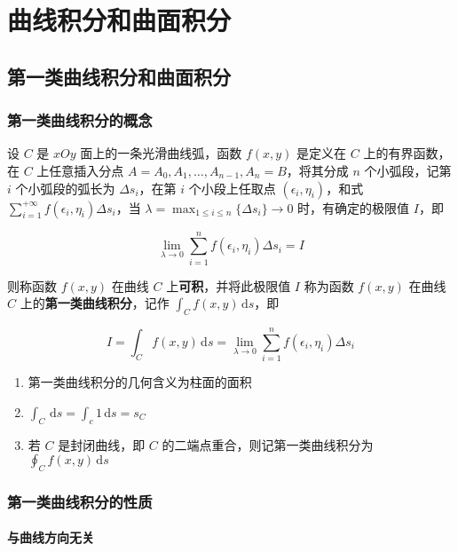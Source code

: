 \documentclass[lang = zh , final , oneside , openany , titlepage , zihao = -4 , linespread = 1.3 , baselineskip = false , cjk-font = windows , text-font = newtx , math-font = newtx , math-style = ISO , uppercase-greek = upright , integral-limits = false]{sjtureport}
\begin{document}
\chapter{曲线积分和曲面积分}

\section{第一类曲线积分和曲面积分}

\subsection{第一类曲线积分的概念}

\begin{definition}
    设 \(C\) 是 \(xOy\) 面上的一条光滑曲线弧，函数 \(f(x,y)\) 是定义在 \(C\)
上的有界函数，在 \(C\) 上任意插入分点
\(A = A_0,A_1,\ldots,A_{n-1},A_n=B\)，将其分成 \(n\) 个小弧段，记第
\(i\) 个小弧段的弧长为 \(\Delta s_i\)，在第 \(i\) 个小段上任取点
\((\epsilon_i,\eta_i)\)，和式
\(\displaystyle\sum_{i=1}^{+\infty}f(\epsilon_i,\eta_i)\Delta s_i\)，当
\(\displaystyle\lambda=\max_{1\leq i\leq n}\{\Delta s_i\}\to 0\)
时，有确定的极限值 \(I\)，即

\[\lim_{\lambda\to 0}\sum_{i=1}^nf(\epsilon_i,\eta_i)\Delta s_i = I\]

则称函数 \(f(x,y)\) 在曲线 \(C\) 上\textbf{可积}，并将此极限值 \(I\)
称为函数 \(f(x,y)\) 在曲线 \(C\) 上的\textbf{第一类曲线积分}，记作
\(\displaystyle\int_Cf(x,y)\,\mathrm{d}s\)，即

\[I = \int_C f(x,y)\,\mathrm{d}s = \lim_{\lambda\to 0}\sum_{i=1}^nf(\epsilon_i,\eta_i)\Delta s_i\]
\end{definition}

\begin{enumerate}
\item
  第一类曲线积分的几何含义为柱面的面积
\item
  \(\displaystyle\int_C\,\mathrm{d}s = \displaystyle\int_c1\,\mathrm{d}s=s_C\)
\item
  若 \(C\) 是封闭曲线，即 \(C\) 的二端点重合，则记第一类曲线积分为
  \(\displaystyle\oint_Cf(x,y)\,\mathrm{d}s\)
\end{enumerate}

\subsection{第一类曲线积分的性质}

\subsubsection{与曲线方向无关}
\end{document}
